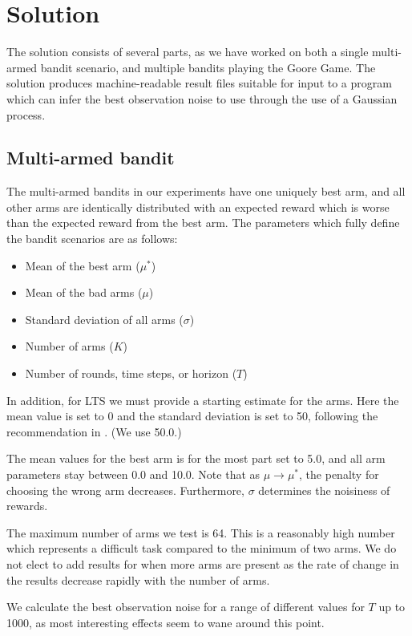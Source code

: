 \chapter{Solution}
\label{ch:solution}

The solution consists of several parts, as we have worked on both a single multi-armed bandit scenario, and multiple bandits playing the Goore Game.
The solution produces machine-readable result files suitable for input to a program which can infer the best observation noise to use through the use of a Gaussian process.


\section{Multi-armed bandit}
The multi-armed bandits in our experiments have one uniquely best arm, and all other arms are identically distributed with an expected reward which is worse than the expected reward from the best arm.
The parameters which fully define the bandit scenarios are as follows:
\begin{itemize}
    \item Mean of the best arm ($\mu^*$)
    \item Mean of the bad arms ($\mu$)
    \item Standard deviation of all arms ($\sigma$)
    \item Number of arms ($K$)
    \item Number of rounds, time steps, or horizon ($T$)
\end{itemize}

In addition, for LTS we must provide a starting estimate for the arms.
Here the mean value is set to 0 and the standard deviation is set to 50, following the recommendation in \cite{Glimsdal12}.
(We use 50.0.)

The mean values for the best arm is for the most part set to 5.0, and all arm parameters stay between 0.0 and 10.0.
Note that as $\mu \to \mu^*$, the penalty for choosing the wrong arm decreases.
Furthermore, $\sigma$ determines the noisiness of rewards.

The maximum number of arms we test is 64.
This is a reasonably high number which represents a difficult task compared to the minimum of two arms.
We do not elect to add results for when more arms are present as the rate of change in the results decrease rapidly with the number of arms.

We calculate the best observation noise for a range of different values for $T$ up to 1000, as most interesting effects seem to wane around this point.

